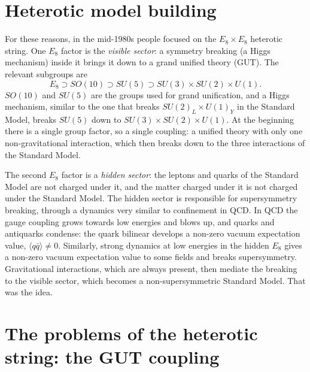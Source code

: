 \section{Heterotic model building}
\label{sec:L2-heterotic}

For these reasons, in the mid-1980s people focused on the $E_8\times E_8$ heterotic string. One $E_8$ factor is the \emph{visible sector}: a symmetry breaking (a Higgs mechanism) inside it brings it down to a grand unified theory (GUT). The relevant subgroups are
\begin{equation}
  E_8 \supset SO(10) \supset SU(5) \supset SU(3)\times SU(2)\times U(1) .
  \label{eq:L2-E8-chain}
\end{equation}
$SO(10)$ and $SU(5)$ are the groups used for grand unification, and a Higgs mechanism, similar to the one that breaks $SU(2)_L\times U(1)_Y$ in the Standard Model, breaks $SU(5)$ down to $SU(3)\times SU(2)\times U(1)$. At the beginning there is a single group factor, so a single coupling: a unified theory with only one non-gravitational interaction, which then breaks down to the three interactions of the Standard Model.

The second $E_8$ factor is a \emph{hidden sector}: the leptons and quarks of the Standard Model are not charged under it, and the matter charged under it is not charged under the Standard Model. The hidden sector is responsible for supersymmetry breaking, through a dynamics very similar to confinement in QCD. In QCD the gauge coupling grows towards low energies and blows up, and quarks and antiquarks condense: the quark bilinear develops a non-zero vacuum expectation value, $\langle q\bar q\rangle\neq0$. Similarly, strong dynamics at low energies in the hidden $E_8$ gives a non-zero vacuum expectation value to some fields and breaks supersymmetry. Gravitational interactions, which are always present, then mediate the breaking to the visible sector, which becomes a non-supersymmetric Standard Model. That was the idea.

\section{The problems of the heterotic string: the GUT coupling}
\label{sec:L2-alphaGUT}


